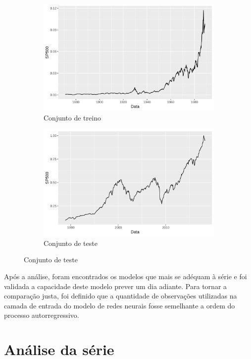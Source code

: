 \documentclass[
    12pt,
    oneside,
    a4paper,
    english,
    brazil
]{abntex2}
\begin{document}
\begin{figure}[ht]
    \caption{Divisão da série entre os conjuntos de treino e teste}\label{fig:traintest}
    \begin{subfigure}{.5\textwidth}
        \centering
        \includegraphics[width=.8\linewidth]{images/SP500_train.png}
        \caption{Conjunto de treino}
    \end{subfigure}
    \begin{subfigure}{.5\textwidth}
        \centering
        \includegraphics[width=.8\linewidth]{images/SP500_test.png}
        \caption{Conjunto de teste}
    \end{subfigure}
\end{figure}

Após a análise, foram encontrados os modelos  que mais se adéquam à série e foi
validada  a capacidade  deste  modelo  prever um  dia  adiante.  Para tornar  a
comparação justa,  foi definido que  a quantidade de observações  utilizadas na
camada  de entrada  do modelo  de  redes neurais  fosse semelhante  a ordem  do
processo autorregressivo.

\section{Análise da série}
\end{document}
